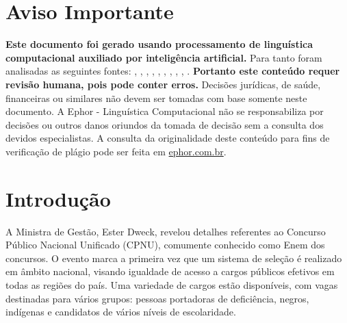 \documentclass[
   article,       
   12pt,          
   oneside,       
   a4paper,       
   english,       
   brazil,        
   sumario=tradicional
   ]{abntex2}
\begin{document}
\frenchspacing 
\maketitle

\textual
\section{Aviso Importante}
\textbf{Este documento foi gerado usando processamento de linguística computacional auxiliado por inteligência artificial.} Para tanto foram analisadas as seguintes fontes:  \cite{A_separacao_dos_tres_poderes_Executivo_Legisl}, \cite{Concurso_Nacional_Unificado_edital_e_retifica}, \cite{Concurso_unificado_a_novidade_do_momentoaclwm}, \cite{Concurso_Unificado_Divulgadas_novas_retificac}, \cite{Enem_dos_Concursos_cerca_de_2_mil_vagas_serao}, \cite{Enem_dos_Concursos_quando_comeca_quanto_custa}, \cite{Enem_dos_concursos_tem_vagas_para_o_Tocantins}, \cite{Inscricoes_para_Enem_dos_Concursos_comecam_ne}, \cite{ldquoEnem_dos_Concursosrdquo_recebe_mais_de_7}, \cite{Saiba_como_vai_funcionar_o_Enem_dos_concursos}.
\textbf{Portanto este conteúdo requer revisão humana, pois pode conter erros.} Decisões jurídicas, de saúde, financeiras ou similares não devem ser tomadas com base somente neste documento. A Ephor - Linguística Computacional não se responsabiliza por decisões ou outros danos oriundos da tomada de decisão sem a consulta dos devidos especialistas.
A consulta da originalidade deste conteúdo para fins de verificação de plágio pode ser feita em \href{http://www.ephor.com.br}{ephor.com.br}.
\section {Introdução}A Ministra de Gestão, Ester Dweck, revelou detalhes referentes ao Concurso Público Nacional Unificado (CPNU), comumente conhecido como \textquotedbl{}Enem dos concursos\textquotedbl{}. O evento marca a primeira vez que um sistema de seleção é realizado em âmbito nacional, visando igualdade de acesso a cargos públicos efetivos em todas as regiões do país. Uma variedade de cargos estão disponíveis, com vagas destinadas para vários grupos: pessoas portadoras de deficiência, negros, indígenas e candidatos de vários níveis de escolaridade.
\end{document}
